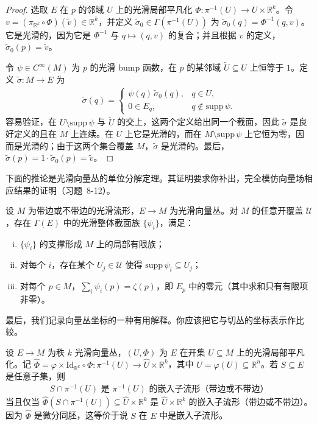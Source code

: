 \documentclass[../../main.tex]{subfiles}
\begin{document}
\begin{proof}
选取 $E$ 在 $p$ 的邻域 $U$ 上的光滑局部平凡化 $\Phi\colon\pi^{-1}(U)\to U\times\mathbb{R}^k$。令 $v=(\pi_{\mathbb{R}^k}\circ\Phi)(\tilde v)\in\mathbb{R}^k$，并定义 $\widetilde\sigma_0\in\Gamma(\pi^{-1}(U))$ 为 $\widetilde\sigma_0(q)=\Phi^{-1}(q,v)$。它是光滑的，因为它是 $\Phi^{-1}$ 与 $q\mapsto(q,v)$ 的复合；并且根据 $v$ 的定义，$\widetilde\sigma_0(p)=\tilde v$。

令 $\psi\in C^\infty(M)$ 为 $p$ 的光滑 bump 函数，在 $p$ 的某邻域 $\widetilde U\subseteq U$ 上恒等于 $1$。定义 $\widetilde\sigma\colon M\to E$ 为
\begin{align*}
\widetilde\sigma(q)=
\begin{cases}
\psi(q)\,\widetilde\sigma_0(q),& q\in U,\\
0\in E_q,& q\notin\mathrm{supp}\,\psi.
\end{cases}
\end{align*}
容易验证，在 $U\setminus\mathrm{supp}\,\psi$ 与 $\widetilde U$ 的交上，这两个定义给出同一个截面，因此 $\widetilde\sigma$ 是良好定义的且在 $M$ 上连续。在 $U$ 上它是光滑的，而在 $M\setminus\mathrm{supp}\,\psi$ 上它恒为零，因而是光滑的；由于这两个集合覆盖 $M$，$\widetilde\sigma$ 是光滑的。最后，$\widetilde\sigma(p)=1\cdot\widetilde\sigma_0(p)=\tilde v$。
\end{proof}

下面的推论是光滑向量丛的单位分解定理。其证明要求你补出，完全模仿向量场相应结果的证明（习题~8-12）。

\begin{corollary}[向量丛的单位分解]\label{corollary:ch10-丛单位分解}
设 $M$ 为带边或不带边的光滑流形，$E\to M$ 为光滑向量丛。对 $M$ 的任意开覆盖 $\mathcal U$，存在 $\Gamma(E)$ 中的光滑整体截面族 $\{\psi_i\}$，满足：
\begin{enumerate}[(i)]
\item $\{\psi_i\}$ 的支撑形成 $M$ 上的局部有限族；
\item 对每个 $i$，存在某个 $U_j\in\mathcal U$ 使得 $\mathrm{supp}\,\psi_i\subseteq U_j$；
\item 对每个 $p\in M$，$\sum_i\psi_i(p)=\zeta(p)$，即 $E_p$ 中的零元（其中求和只有有限项非零）。
\end{enumerate}
\end{corollary}

最后，我们记录向量丛坐标的一种有用解释。你应该把它与切丛的坐标表示作比较。

\begin{example}[光滑向量丛的局部截面]\label{example:ch10-丛的局部截面}
设 $E\to M$ 为秩 $k$ 光滑向量丛，$(U,\Phi)$ 为 $E$ 在开集 $U\subseteq M$ 上的光滑局部平凡化。记 $\widehat\Phi=\varphi\times\mathrm{Id}_{\mathbb{R}^k}\circ\Phi\colon\pi^{-1}(U)\to\widehat U\times\mathbb{R}^k$，其中 $\widehat U=\varphi(U)\subseteq\mathbb{R}^n$。若 $S\subseteq E$ 是任意子集，则
\begin{align*}
S\cap\pi^{-1}(U)\text{ 是 }\pi^{-1}(U)\text{ 的嵌入子流形（带边或不带边）}
\end{align*}
当且仅当 $\widehat\Phi(S\cap\pi^{-1}(U))\subseteq\widehat U\times\mathbb{R}^k$ 是 $\widehat U\times\mathbb{R}^k$ 的嵌入子流形（带边或不带边）。因为 $\widehat\Phi$ 是微分同胚，这等价于说 $S$ 在 $E$ 中是嵌入子流形。
\end{example}
\end{document}
